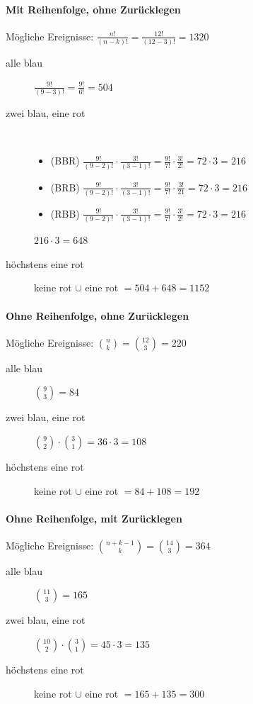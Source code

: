 \documentclass[11pt, a4paper]{article}
\begin{document}
\paragraph{Mit Reihenfolge, ohne Zurücklegen}
Mögliche Ereignisse: $\frac{n!}{(n-k)!} = \frac{12!}{(12-3)!} = 1320$
\begin{description}
	\item[alle blau] $\frac{9!}{(9-3)!} = \frac{9!}{6!} = 504$
	\item[zwei blau, eine rot] \
		\begin{itemize}
			\item (BBR) $\frac{9!}{(9-2)!} \cdot \frac{3!}{(3-1)!} = \frac{9!}{7!} \cdot \frac{3!}{2!} = 72 \cdot 3 = 216$
			\item (BRB) $\frac{9!}{(9-2)!} \cdot \frac{3!}{(3-1)!} = \frac{9!}{7!} \cdot \frac{3!}{21} = 72 \cdot 3 = 216$
			\item (RBB) $\frac{9!}{(9-2)!} \cdot \frac{3!}{(3-1)!} = \frac{9!}{7!} \cdot \frac{3!}{2!} = 72 \cdot 3 = 216$
		\end{itemize}
		$216 \cdot 3 = 648$
	\item[höchstens eine rot] keine rot $\cup$ eine rot $= 504 + 648 = 1152$
\end{description}

\paragraph{Ohne Reihenfolge, ohne Zurücklegen}
Mögliche Ereignisse: $\binom{n}{k} = \binom{12}{3} = 220$
\begin{description}
	\item[alle blau] $\binom{9}{3} = 84$
	\item[zwei blau, eine rot] $\binom{9}{2} \cdot \binom{3}{1} = 36 \cdot 3 = 108$
	\item[höchstens eine rot] keine rot $\cup$ eine rot $= 84 + 108 = 192$
\end{description}

\paragraph{Ohne Reihenfolge, mit Zurücklegen}
Mögliche Ereignisse: $\binom{n+k-1}{k} = \binom{14}{3} = 364$
\begin{description}
	\item[alle blau] $\binom{11}{3} = 165$
	\item[zwei blau, eine rot] $\binom{10}{2} \cdot \binom{3}{1} = 45 \cdot 3 = 135$
	\item[höchstens eine rot] keine rot $\cup$ eine rot $= 165 + 135 = 300$
\end{description}
\end{document}
